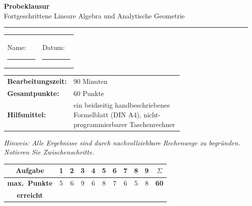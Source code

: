 \documentclass[a4paper,11pt]{article}
\begin{document}
\color{fg}

\thispagestyle{fancy}

\begin{center}
  {\color{accent}\LARGE\bfseries Probeklausur}\\[0.3em]
  {\color{fg}\large Fortgeschrittene Lineare Algebra und Analytische Geometrie}\\[0.6em]
  {\color{gridcolor}\rule{\linewidth}{0.4pt}}
\end{center}

\vspace{0.4em}

\renewcommand{\arraystretch}{1.6}
\begin{tabular}{@{}p{0.5\linewidth}@{}p{0.5\linewidth}@{}}
  Name: \ \rule[-2pt]{0.7\linewidth}{0.4pt} &
  Datum: \ \rule[-2pt]{0.55\linewidth}{0.4pt}
\end{tabular}

\vspace{0.6em}

\begin{tabular}{@{}l p{0.72\linewidth}@{}}
  \textbf{\color{accent}Bearbeitungszeit:} & 90 Minuten \\
  \textbf{\color{accent}Gesamtpunkte:}     & 60 Punkte \\
  \textbf{\color{accent}Hilfsmittel:}      & ein beidseitig handbeschriebenes Formelblatt (DIN A4), nicht-programmierbarer Taschenrechner \\
\end{tabular}

\vspace{0.4em}

\textit{\color{fg}\small Hinweis: Alle Ergebnisse sind durch nachvollziehbare Rechenwege zu begründen. Notieren Sie Zwischenschritte.}

\vspace{1.0em}

\renewcommand{\arraystretch}{1.5}
\noindent
\begin{tabular}{|c|*{9}{c|}c|}
\hline
\textbf{Aufgabe} & 1 & 2 & 3 & 4 & 5 & 6 & 7 & 8 & 9 & \textbf{$\Sigma$} \\
\hline
\textbf{max.\ Punkte} & 5 & 6 & 9 & 6 & 8 & 7 & 6 & 5 & 8 & \textbf{60} \\
\hline
\textbf{erreicht} & & & & & & & & & & \\
\hline
\end{tabular}
\end{document}

